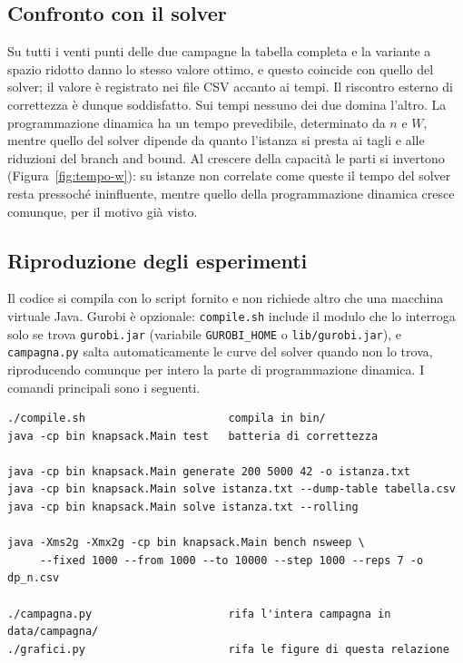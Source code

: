 \documentclass[11pt]{article}
\begin{document}
\subsection{Confronto con il solver}
Su tutti i venti punti delle due campagne la tabella completa e la variante a
spazio ridotto danno lo stesso valore ottimo, e questo coincide con quello del
solver; il valore \`e registrato nei file CSV accanto ai tempi. Il riscontro
esterno di correttezza \`e dunque soddisfatto. Sui
tempi nessuno dei due domina l'altro. La programmazione dinamica ha un tempo
prevedibile, determinato da $n$ e $W$, mentre quello del solver dipende da
quanto l'istanza si presta ai tagli e alle riduzioni del branch and bound. Al
crescere della capacit\`a le parti si invertono (Figura~\ref{fig:tempo-w}): su
istanze non correlate come queste il tempo del solver resta pressoch\'e
ininfluente, mentre quello della programmazione dinamica cresce comunque, per il
motivo gi\`a visto.

\subsection{Riproduzione degli esperimenti}
Il codice si compila con lo script fornito e non richiede altro che una macchina
virtuale Java. Gurobi \`e opzionale: \texttt{compile.sh} include il modulo che lo
interroga solo se trova \texttt{gurobi.jar} (variabile \texttt{GUROBI\_HOME} o
\texttt{lib/gurobi.jar}), e \texttt{campagna.py} salta automaticamente le curve
del solver quando non lo trova, riproducendo comunque per intero la parte di
programmazione dinamica. I comandi principali sono i seguenti.

\begin{codice}
\begin{Verbatim}[fontsize=\small]
./compile.sh                      compila in bin/
java -cp bin knapsack.Main test   batteria di correttezza

java -cp bin knapsack.Main generate 200 5000 42 -o istanza.txt
java -cp bin knapsack.Main solve istanza.txt --dump-table tabella.csv
java -cp bin knapsack.Main solve istanza.txt --rolling

java -Xms2g -Xmx2g -cp bin knapsack.Main bench nsweep \
     --fixed 1000 --from 1000 --to 10000 --step 1000 --reps 7 -o dp_n.csv

./campagna.py                     rifa l'intera campagna in data/campagna/
./grafici.py                      rifa le figure di questa relazione
\end{Verbatim}
\end{codice}
\end{document}
